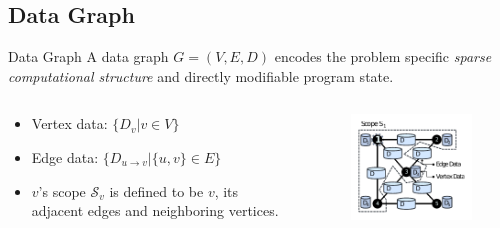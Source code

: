 \documentclass[onlymath,xcolor=pdftex,dvipsnames,table]{beamer}
\let\oldemph\emph
\renewcommand{\emph}[1]{{\color{Blue}\oldemph{#1}}}
\theoremstyle{remark} %
\begin{document}
\subsection{Data Graph}
\begin{frame}{Data Graph}
A data graph $G=(V,E,D)$ encodes the problem specific \emph{sparse computational structure} and directly modifiable program state.
\begin{columns}
  \begin{column}{0.6\textwidth}
    \begin{itemize}
      \item Vertex data: $\{D_v|v\in V\}$
      \item Edge data: $\{D_{u\rightarrow v}|\{u,v\}\in E\}$
      \item $v$'s scope $\mathcal{S}_v$ is defined to be $v$, its adjacent edges and neighboring vertices.
    \end{itemize}
  \end{column}
  \begin{column}{0.4\textwidth}
    \begin{figure}
      \centering
      \includegraphics[width=\textwidth]{datagraph.pdf}
    \end{figure}
  \end{column}
\end{columns}
\end{frame}
\end{document}
